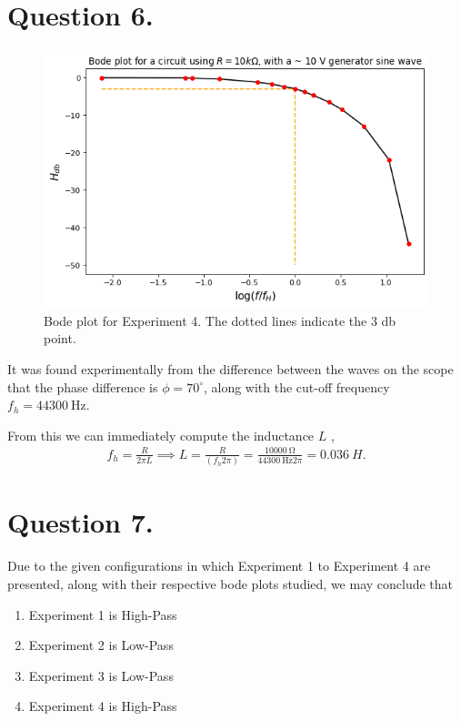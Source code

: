 \documentclass[
	12pt,
	]{article}
\theoremstyle{definition}
\theoremstyle{definition}
\theoremstyle{definition}
\theoremstyle{definition}
\theoremstyle{definition}
\theoremstyle{example}
\theoremstyle{note}
\theoremstyle{remark}
\theoremstyle{example}
\begin{document}
		\section*{Question 6.}
			\begin{figure}[H]
				\centering
				\includegraphics[width= 0.9\linewidth]{phys241_lab3_picture4.png}
				\captionsetup{margin=1cm}
				\caption{Bode plot for Experiment 4. The dotted lines indicate the $3$ db point.}
			\end{figure}
			It was found experimentally from the difference between the waves on the scope that the phase difference is $\phi = 70 ^\circ$, along with the cut-off frequency $f_{h} = 44 300 \ \si{\hertz}$. 
			
			From this we can immediately compute the inductance $L$ , 
			\begin{gather*}
				f_{h} = \frac{R}{2\pi L } \implies L = \frac{R}{(f_{h}2\pi )} = \frac{10 000 \ \si{\ohm}}{44300 \ \si{\hertz} 2\pi} = 0.036 \ H.
			\end{gather*}
		\section*{Question 7.}
		Due to the given configurations in which Experiment 1 to Experiment 4 are presented, along with their respective bode plots studied, we may conclude that 
			\begin{enumerate}
			\centering
				\item Experiment 1 is High-Pass 
				\item Experiment 2 is Low-Pass
				\item Experiment 3 is Low-Pass
				\item Experiment 4 is High-Pass
			\end{enumerate}
			
\end{document}

